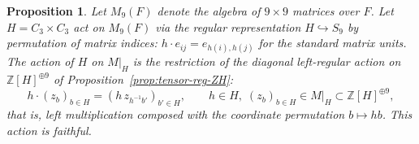 \documentclass[12pt,a4paper]{article}
\newtheorem{proposition}[theorem]{Proposition}
\theoremstyle{definition}
\newtheorem{remark}[theorem]{Remark}
\DeclareMathOperator{\coh}{H}
\begin{document}

\begin{proposition}\label{prop:faithful-MH}
Let \(M_9(F)\) denote the algebra of \(9 \times 9\) matrices over \(F\).
Let \(H = C_3 \times C_3\) act on \(M_9(F)\) via the regular representation
\(H \hookrightarrow S_9\) by permutation of matrix indices:
\(h \cdot e_{ij} = e_{h(i), h(j)}\) for the standard matrix units.
The action of \(H\) on \(M|_H\) is the restriction of the diagonal
left-regular action on \(\mathbb{Z}[H]^{\oplus 9}\) of
Proposition~\ref{prop:tensor-reg-ZH}:
\[
h \cdot (z_b)_{b \in H} = (h\, z_{h^{-1} b'})_{b' \in H},
\qquad
h \in H,\; (z_b)_{b \in H} \in M|_H \subset \mathbb{Z}[H]^{\oplus 9},
\]
that is, left multiplication composed with the coordinate permutation
\(b \mapsto h b\).
This action is faithful.
\end{proposition}
\end{document}

